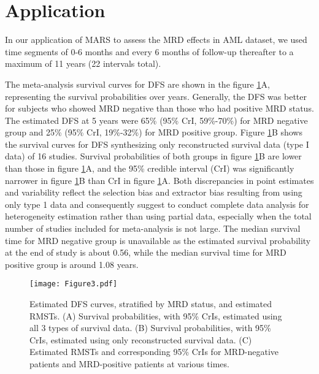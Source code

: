 \documentclass[12pt]{article}
\theoremstyle{mystyle}
\begin{document}
\section{Application}
\label{sec:7} 

In our application of MARS to assess the MRD effects in AML dataset, we used time segments of 0-6 months and every 6 months of follow-up thereafter to a maximum of 11 years (22 intervals total).

The meta-analysis survival curves for DFS are shown in the figure \ref{fig:FIG3}A, representing the survival probabilities over years. Generally, the DFS was better for subjects who showed MRD negative than those who had positive MRD status. The estimated DFS at 5 years were 65\% (95\% CrI, 59\%-70\%) for MRD negative group and 25\% (95\% CrI, 19\%-32\%) for MRD positive group. Figure \ref{fig:FIG3}B shows the survival curves for DFS synthesizing only reconstructed survival data (type I data) of 16 studies. Survival probabilities of both groups in figure \ref{fig:FIG3}B are lower than those in figure \ref{fig:FIG3}A, and the 95\% credible interval (CrI) was significantly narrower in figure \ref{fig:FIG3}B than CrI in figure \ref{fig:FIG3}A. Both discrepancies in point estimates and variability reflect the selection bias and extractor bias resulting from using only type 1 data and consequently suggest to conduct complete data analysis for heterogeneity estimation rather than using partial data, especially when the total number of studies included for meta-analysis is not large. The median survival time for MRD negative group is unavailable as the estimated survival probability at the end of study is about 0.56, while the median survival time for MRD positive group is around 1.08 years.

\vspace{20pt}
\begin{figure}[ht]
\texttt{[image: Figure3.pdf]}\vspace{-5pt}
\caption{\linespread{1.3}\selectfont{}\label{fig:FIG3}{Estimated DFS curves, stratified by MRD status, and estimated RMSTs. (A) Survival probabilities, with 95\% CrIs, estimated using all 3 types of survival data. (B) Survival probabilities, with 95\% CrIs, estimated using only reconstructed survival data. (C) Estimated RMSTs and corresponding 95\% CrIs for MRD-negative patients and MRD-positive patients at various times. 
}}\vspace{10pt}
\end{figure}
\end{document}
